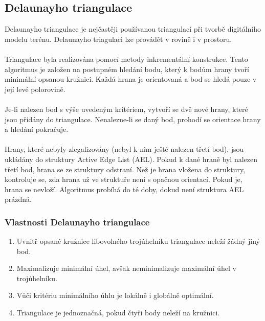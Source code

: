 \documentclass[a4paper, 12pt]{article}
\begin{document}
\subsection{Delaunayho triangulace}
Delaunayho triangulace je nejčastěji používanou triangulací při tvorbě digitálního modelu terénu. Delaunayho triagulaci lze provádět v rovině i v prostoru.\\
\\
Triangulace byla realizována pomocí metody inkrementální konstrukce. Tento algoritmus je založen na postupném hledání bodu, který k bodům hrany tvoří minimální opsanou kružnici. Každá hrana je orientovaná a bod se hledá pouze v její levé polorovině.\\
\\
Je-li nalezen bod s výše uvedeným kritériem, vytvoří se dvě nové hrany, které jsou přidány do triangulace. Nenalezne-li se daný bod, prohodí se orientace hrany a hledání pokračuje.\\
\\
Hrany, které nebyly zlegalizovány (nebyl k nim ještě nalezen třetí bod), jsou ukládány do struktury Active Edge List (AEL). Pokud k dané hraně byl nalezen třetí bod, hrana se ze struktury odstraní. Než je hrana vložena do struktury, kontroluje se, zda hrana už ve struktuře není s opačnou orientací. Pokud je, hrana se nevloží. Algoritmus probíhá do té doby, dokud není struktura AEL prázdná.

\subsubsection{Vlastnosti Delaunayho triangulace}

\begin{enumerate}
\item Uvnitř opsané kružnice libovolného trojúhelníku triangulace neleží žádný jiný bod.
\item Maximalizuje minimální úhel, avšak neminimalizuje maximální úhel v trojúhelníku.
\item Vůči kritériu minimálního úhlu je lokálně i globálně optimální.
\item Triangulace je jednoznačná, pokud čtyři body neleží na kružnici.
\end{enumerate}
\end{document}
